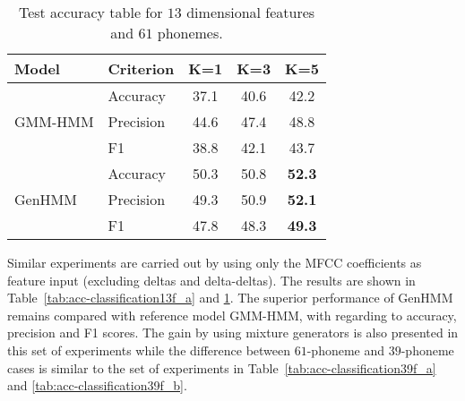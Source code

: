 \begin{table}
  \caption{Test accuracy table for $13$ dimensional features and $61$
    phonemes.}\label{tab:acc-classification13f_b}
  \centering
  \begin{tabular}{llccc}
    \toprule
    {Model} & Criterion &  K=1 &  K=3 &  K=5 \\ \midrule
    \multirow{3}{*}{GMM-HMM}
            & Accuracy & 37.1 &  40.6 & 42.2  \\
            &Precision & 44.6 &  47.4 & 48.8  \\
            & F1       & 38.8 &  42.1 & 43.7 \\
    \midrule
    \multirow{3}{*}{GenHMM}
            & Accuracy & 50.3 & 50.8 & \textbf{52.3}   \\
            & Precision& 49.3 & 50.9 & \textbf{52.1} \\
            &F1        & 47.8 & 48.3 & \textbf{49.3} \\
    \bottomrule
  \end{tabular}
  \vspace{0.5cm}
\end{table}

Similar experiments are carried out by using only the MFCC coefficients as feature input (excluding deltas and delta-deltas). The results are shown in Table~\ref{tab:acc-classification13f_a} and \ref{tab:acc-classification13f_b}. The superior performance of GenHMM remains compared with reference model GMM-HMM, with regarding to accuracy, precision and F1 scores. The gain by using mixture generators is also presented in this set of experiments while the difference between $61$-phoneme and $39$-phoneme cases is similar to the set of experiments in Table~\ref{tab:acc-classification39f_a} and \ref{tab:acc-classification39f_b}.

